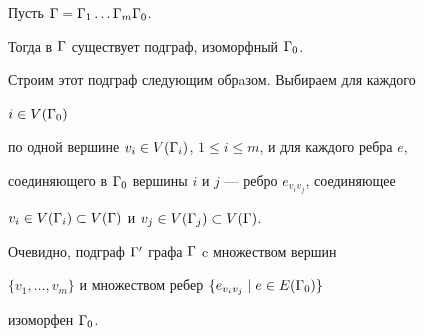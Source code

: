 \begin{lem}


Пусть ${\Gamma}={\Gamma}_1\dotsc {\Gamma}_m{\Gamma}_0$. 


Тогда в ${\Gamma}$ существует подграф, изоморфный ${\Gamma}_0$.


\end{lem}





\begin{pf}


Строим этот подграф следующим обрaзом. Выбираем для каждого\linebreak


$i\in V({\Gamma}_0)$


по одной вершине $v_i\in V({\Gamma}_i)$, $1\leq i\leq m$, и для каждого ребра $e$, 


соединяющего в ${\Gamma}_0$ вершины $i$ и $j$ --- ребро $e_{v_iv_j}$, соединяющее


$v_i\in V({\Gamma}_i)\subset V({\Gamma})$ и $v_j\in V({\Gamma}_j)\subset V({\Gamma})$. 


Очевидно, подграф ${\Gamma}'$ графа ${\Gamma}$ c множеством вершин 


$\{ v_1,\dotsc ,v_m\}$ и множеством ребер $\{ e_{v_iv_j} \mid e\in E({\Gamma}_0)\}$ 


изоморфен ${\Gamma}_0$.


\end{pf}





